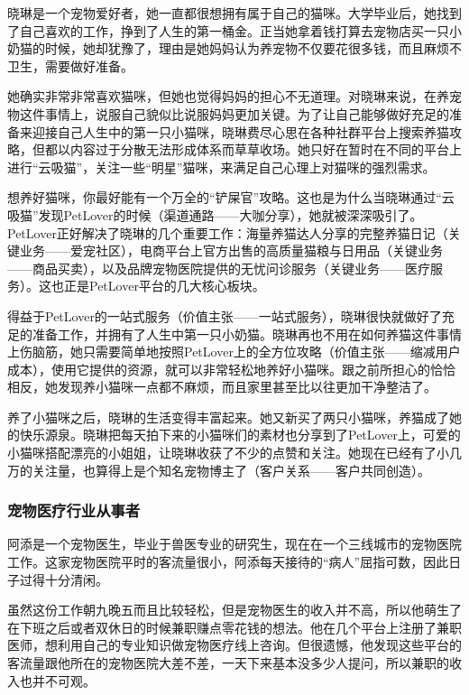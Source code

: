 \documentclass[a4paper]{ctexart}
\begin{document}
晓琳是一个宠物爱好者，她一直都很想拥有属于自己的猫咪。大学毕业后，她找到了自己喜欢的工作，挣到了人生的第一桶金。正当她拿着钱打算去宠物店买一只小奶猫的时候，她却犹豫了，理由是她妈妈认为养宠物不仅要花很多钱，而且麻烦不卫生，需要做好准备。

她确实非常非常喜欢猫咪，但她也觉得妈妈的担心不无道理。对晓琳来说，在养宠物这件事情上，说服自己貌似比说服妈妈更加关键。为了让自己能够做好充足的准备来迎接自己人生中的第一只小猫咪，晓琳费尽心思在各种社群平台上搜索养猫攻略，但都以内容过于分散无法形成体系而草草收场。她只好在暂时在不同的平台上进行“云吸猫”，关注一些“明星”猫咪，来满足自己心理上对猫咪的强烈需求。

想养好猫咪，你最好能有一个万全的“铲屎官”攻略。这也是为什么当晓琳通过“云吸猫”发现PetLover的时候（渠道通路——大咖分享），她就被深深吸引了。PetLover正好解决了晓琳的几个重要工作：海量养猫达人分享的完整养猫日记（关键业务——爱宠社区），电商平台上官方出售的高质量猫粮与日用品（关键业务——商品买卖），以及品牌宠物医院提供的无忧问诊服务（关键业务——医疗服务）。这也正是PetLover平台的几大核心板块。

得益于PetLover的一站式服务（价值主张——一站式服务），晓琳很快就做好了充足的准备工作，并拥有了人生中第一只小奶猫。晓琳再也不用在如何养猫这件事情上伤脑筋，她只需要简单地按照PetLover上的全方位攻略（价值主张——缩减用户成本），使用它提供的资源，就可以非常轻松地养好小猫咪。跟之前所担心的恰恰相反，她发现养小猫咪一点都不麻烦，而且家里甚至比以往更加干净整洁了。

养了小猫咪之后，晓琳的生活变得丰富起来。她又新买了两只小猫咪，养猫成了她的快乐源泉。晓琳把每天拍下来的小猫咪们的素材也分享到了PetLover上，可爱的小猫咪搭配漂亮的小姐姐，让晓琳收获了不少的点赞和关注。她现在已经有了小几万的关注量，也算得上是个知名宠物博主了（客户关系——客户共同创造）。

\subsubsection{宠物医疗行业从事者}

阿添是一个宠物医生，毕业于兽医专业的研究生，现在在一个三线城市的宠物医院工作。这家宠物医院平时的客流量很小，阿添每天接待的“病人”屈指可数，因此日子过得十分清闲。

虽然这份工作朝九晚五而且比较轻松，但是宠物医生的收入并不高，所以他萌生了在下班之后或者双休日的时候兼职赚点零花钱的想法。他在几个平台上注册了兼职医师，想利用自己的专业知识做宠物医疗线上咨询。但很遗憾，他发现这些平台的客流量跟他所在的宠物医院大差不差，一天下来基本没多少人提问，所以兼职的收入也并不可观。
\end{document}
